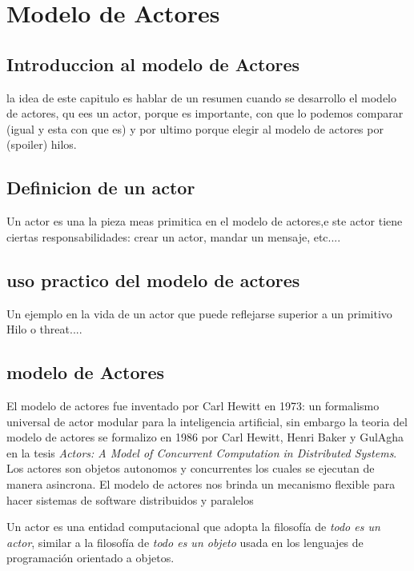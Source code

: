 
\chapter{Modelo de Actores} %
\label{Chapter2}


\section{Introduccion al modelo de Actores}

la idea de este capitulo es hablar de un resumen cuando se desarrollo el modelo de actores, qu ees un actor, porque es importante,  con que lo podemos comparar (igual y esta con que es) y por ultimo porque elegir al modelo de actores por (spoiler) hilos.

\section{Definicion de un actor}
Un actor es una la pieza meas primitica en el modelo de actores,e ste actor tiene ciertas responsabilidades: crear un actor, mandar un mensaje, etc....
\section{uso practico del modelo de actores}
Un ejemplo en la vida de un actor que puede reflejarse superior a un primitivo Hilo o threat....


\section{modelo de Actores}


El modelo de actores fue inventado por Carl Hewitt  en 1973: un formalismo
universal de actor modular para la inteligencia artificial, sin embargo la
teoria del modelo de actores se formalizo en 1986 por Carl Hewitt, Henri Baker y
GulAgha en la  tesis \emph{Actors: A Model of Concurrent Computation in
  Distributed Systems}. Los actores son objetos autonomos y concurrentes los
cuales se ejecutan de manera asincrona. El modelo de actores  nos brinda un
mecanismo flexible para  hacer sistemas de software  distribuidos y paralelos

Un actor es una entidad computacional que adopta la filosof\'ia de \emph{todo es un actor}, similar a la filosof\'ia de \emph{todo es un objeto} usada en los lenguajes de programaci\'on orientado a objetos.


